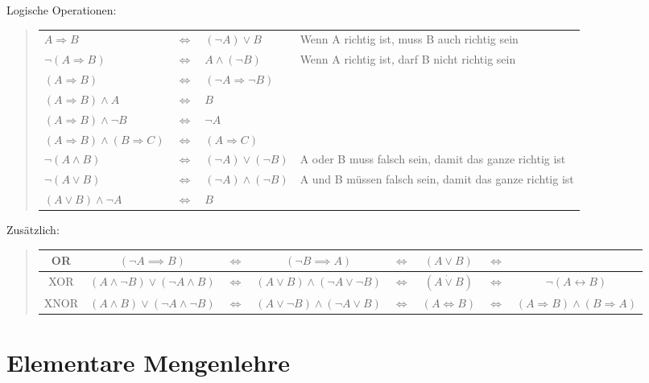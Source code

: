 Logische Operationen:
\begin{verse}
\begin{tabular}{|l|l|l|l}
\cline{1-3} 
$A\Rightarrow B$ & $\Leftrightarrow$ & $(\neg A)\vee B$ & Wenn A richtig ist, muss B auch richtig sein\tabularnewline
\cline{1-3} 
$\neg(A\Rightarrow B)$ & $\Leftrightarrow$ & $A\wedge(\neg B)$ & Wenn A richtig ist, darf B nicht richtig sein\tabularnewline
\cline{1-3} 
$(A\Rightarrow B)$ & $\Leftrightarrow$ & $(\neg A\Rightarrow\neg B)$ & \tabularnewline
\cline{1-3} 
$(A\Rightarrow B)\wedge A$ & $\Leftrightarrow$ & $B$ & \tabularnewline
\cline{1-3} 
$(A\Rightarrow B)\wedge\neg B$ & $\Leftrightarrow$ & $\neg A$ & \tabularnewline
\cline{1-3} 
$(A\Rightarrow B)\wedge(B\Rightarrow C)$ & $\Leftrightarrow$ & $(A\Rightarrow C)$ & \tabularnewline
\cline{1-3} 
$\neg(A\wedge B)$ & $\Leftrightarrow$ & $(\neg A)\vee(\neg B)$ & A oder B muss falsch sein, damit das ganze richtig ist\tabularnewline
\cline{1-3} 
$\neg(A\vee B)$ & $\Leftrightarrow$ & $(\neg A)\wedge(\neg B)$ & A und B müssen falsch sein, damit das ganze richtig ist\tabularnewline
\cline{1-3} 
$(A\vee B)\wedge\neg A$ & $\Leftrightarrow$ & $B$ & \tabularnewline
\cline{1-3} 
\end{tabular}
\end{verse}
Zusätzlich:
\begin{verse}
\begin{tabular}{|c|c|c|c|c|c|c|c|}
\hline 
OR & $(\neg A\implies B)$ & $\Leftrightarrow$ & $(\neg B\implies A)$ & $\Leftrightarrow$ & $(A\vee B)$ & $\Leftrightarrow$ & \tabularnewline
\hline 
XOR & $(A\wedge\neg B)\vee(\neg A\wedge B)$ & $\Leftrightarrow$ & $(A\vee B)\wedge(\neg A\vee\neg B)$ & $\Leftrightarrow$ & $(A\dot{\vee}B)$ & $\Leftrightarrow$ & $\neg(A\leftrightarrow B)$\tabularnewline
\hline 
XNOR & $(A\wedge B)\vee(\neg A\wedge\neg B)$ & $\Leftrightarrow$ & $(A\vee\neg B)\wedge(\neg A\vee B)$ & $\Leftrightarrow$ & $(A\Leftrightarrow B)$ & $\Leftrightarrow$ & $(A\Rightarrow B)\wedge(B\Rightarrow A)$\tabularnewline
\hline 
\end{tabular}
\end{verse}

\section*{Elementare Mengenlehre}


